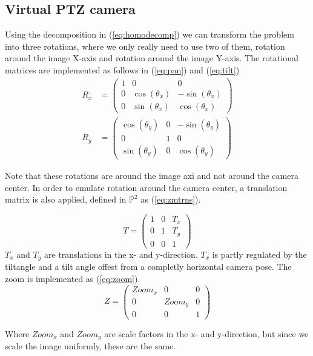 \subsection{Virtual PTZ camera}
Using the decomposition in (\ref{eq:homodecomp}) we can transform the problem into three rotations, where we only really need to use two of them, rotation around the image X-axis and rotation around the image Y-axis. The rotational matrices are implemented as follows in (\ref{eq:pan}) and (\ref{eq:tilt})
	\begin{align}
		R_x &=\begin{pmatrix}1 & 0 & 0 \\
			0 & \cos(\theta_x) & -\sin(\theta_x) \\
			0 & \sin(\theta_x) & \cos(\theta_x)
		\end{pmatrix} \label{eq:pan}\\
		R_y&=\begin{pmatrix} \cos(\theta_y) & 0 & -\sin(\theta_y) \\
			0 & 1 & 0 \\
			\sin(\theta_y) & 0 & \cos(\theta_y)
		\end{pmatrix} \label{eq:tilt}
	\end{align}

	Note that these rotations are around the image axi and not around the camera center. In order to emulate rotation around the camera center, a translation matrix is also applied, defined in $\mathbb{P}^2$ as (\ref{eq:zmtrns}).

	\begin{equation}
		T=\begin{pmatrix}
			1 & 0 & T_x \\
			0 & 1 & T_y \\
			0 & 0 & 1
		\end{pmatrix} \label{eq:zmtrns}
	\end{equation}
	$T_x$ and $T_y$ are translations in the x- and y-direction. $T_x$ is partly regulated by the tiltangle and a tilt angle offest from a completly horizontal camera pose.
	The zoom is implemented as (\ref{eq:zoom}).
	\begin{equation}
		Z=\begin{pmatrix}
			Zoom_x & 0 & 0\\
			0 & Zoom_y & 0\\
			0 & 0 & 1
		\end{pmatrix}
		\label{eq:zoom}
	\end{equation}

	Where $Zoom_x$ and $Zoom_y$ are scale factors in the x- and y-direction, but since we scale the image uniformly, these are the same. 

